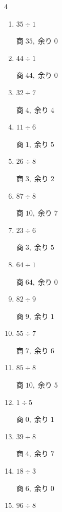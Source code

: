 \begin{multicols}{4}
\begin{enumerate}
        $商\; 12,\; 余り\; 3$

  \item $35 \div 1$

        $商\; 35,\; 余り\; 0$

  \item $44 \div 1$

        $商\; 44,\; 余り\; 0$

  \item $32 \div 7$

        $商\; 4,\; 余り\; 4$

\columnbreak %

  \item $11 \div 6$

        $商\; 1,\; 余り\; 5$

  \item $26 \div 8$

        $商\; 3,\; 余り\; 2$

  \item $87 \div 8$

        $商\; 10,\; 余り\; 7$

  \item $23 \div 6$

        $商\; 3,\; 余り\; 5$

  \item $64 \div 1$

        $商\; 64,\; 余り\; 0$

  \item $82 \div 9$

        $商\; 9,\; 余り\; 1$

  \item $55 \div 7$

        $商\; 7,\; 余り\; 6$

  \item $85 \div 8$

        $商\; 10,\; 余り\; 5$

  \item $1 \div 5$

        $商\; 0,\; 余り\; 1$

  \item $39 \div 8$

        $商\; 4,\; 余り\; 7$

  \item $18 \div 3$

        $商\; 6,\; 余り\; 0$

  \item $96 \div 8$


\end{enumerate}
\end{multicols}
